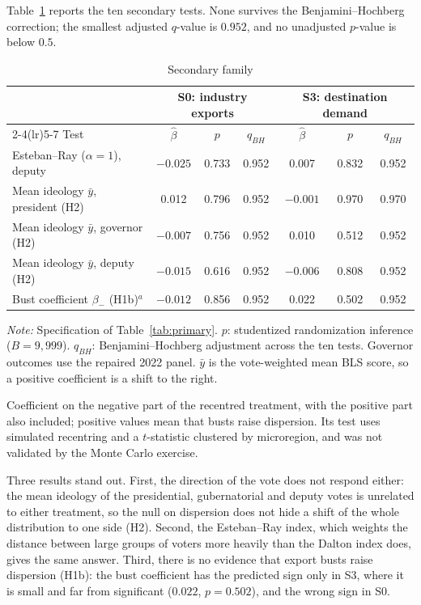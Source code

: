 \documentclass[
	11pt,				%
	oneside,			%
	a4paper,			%
	english,			%
	english				%
	]{abntex2ppgsi}
\theoremstyle{plain}
\theoremstyle{remark}
\theoremstyle{plain}%
\theoremstyle{remark}%
\begin{document}
Table~\ref{tab:secondary} reports the ten secondary tests. None survives the Benjamini--Hochberg correction; the smallest adjusted $q$-value is $0.952$, and no unadjusted $p$-value is below $0.5$.

\begin{table}[!htbp]
\centering
\caption{Secondary family}
\label{tab:secondary}
\begin{threeparttable}
\small
\begin{tabular*}{\textwidth}{@{\extracolsep{\fill}}lcccccc@{}}
\toprule
 & \multicolumn{3}{c}{S0: industry exports} & \multicolumn{3}{c}{S3: destination demand} \\
\cmidrule(lr){2-4}\cmidrule(lr){5-7}
Test & $\hat\beta$ & $p$ & $q_{BH}$ & $\hat\beta$ & $p$ & $q_{BH}$ \\
\midrule
Esteban--Ray ($\alpha = 1$), deputy & $-0.025$ & 0.733 & 0.952 & 0.007 & 0.832 & 0.952 \\
Mean ideology $\bar{y}$, president (H2) & 0.012 & 0.796 & 0.952 & $-0.001$ & 0.970 & 0.970 \\
Mean ideology $\bar{y}$, governor (H2) & $-0.007$ & 0.756 & 0.952 & 0.010 & 0.512 & 0.952 \\
Mean ideology $\bar{y}$, deputy (H2) & $-0.015$ & 0.616 & 0.952 & $-0.006$ & 0.808 & 0.952 \\
Bust coefficient $\beta_{-}$ (H1b)$^{a}$ & $-0.012$ & 0.856 & 0.952 & 0.022 & 0.502 & 0.952 \\
\bottomrule
\end{tabular*}
\begin{tablenotes}[flushleft]
\footnotesize
\item \textit{Note:} Specification of Table~\ref{tab:primary}. $p$: studentized randomization inference ($B = 9{,}999$). $q_{BH}$: Benjamini--Hochberg adjustment across the ten tests. Governor outcomes use the repaired 2022 panel. $\bar{y}$ is the vote-weighted mean BLS score, so a positive coefficient is a shift to the right.
\item[a] Coefficient on the negative part of the recentred treatment, with the positive part also included; positive values mean that busts raise dispersion. Its test uses simulated recentring and a $t$-statistic clustered by microregion, and was not validated by the Monte Carlo exercise.
\end{tablenotes}
\end{threeparttable}
\end{table}

Three results stand out. First, the direction of the vote does not respond either: the mean ideology of the presidential, gubernatorial and deputy votes is unrelated to either treatment, so the null on dispersion does not hide a shift of the whole distribution to one side (H2). Second, the Esteban--Ray index, which weights the distance between large groups of voters more heavily than the Dalton index does, gives the same answer. Third, there is no evidence that export busts raise dispersion (H1b): the bust coefficient has the predicted sign only in S3, where it is small and far from significant ($0.022$, $p = 0.502$), and the wrong sign in S0.
\end{document}
